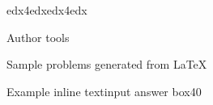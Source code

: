 \documentclass[12pt]{article}
\begin{document}
\begin{edXcourse}{edx4edx}{edx4edx}
\begin{edXchapter}{Author tools}
\begin{edXsection}{Sample problems generated from LaTeX}
\begin{edXsequential}
\begin{edXproblem}{Example inline textinput answer box}{40}
\end{edXproblem}

\end{edXsequential}

\end{edXsection}
\end{edXchapter}
\end{edXcourse}
\end{document}
